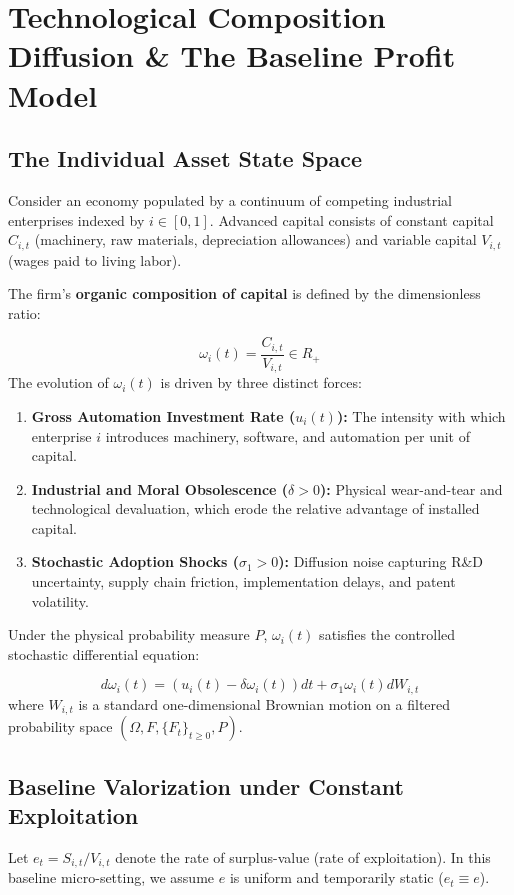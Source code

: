 \documentclass[11pt,letterpaper]{report}
\begin{document}
\section{Technological Composition Diffusion \& The Baseline Profit Model}
\subsection{The Individual Asset State Space}
Consider an economy populated by a continuum of competing industrial enterprises indexed by $i\in [0,1]$. Advanced capital consists of constant capital ${C}_{i,t}$ (machinery, raw materials, depreciation allowances) and variable capital ${V}_{i,t}$ (wages paid to living labor).

The firm's \textbf{organic composition of capital} is defined by the dimensionless ratio:

\[
{\omega }_{i}(t)=\frac{{C}_{i,t}}{{V}_{i,t}}\in {R}_{+}
\]
The evolution of ${\omega }_{i}(t)$ is driven by three distinct forces:

\begin{enumerate}
\item \textbf{Gross Automation Investment Rate (${u}_{i}(t)$):} The intensity with which enterprise $i$ introduces machinery, software, and automation per unit of capital.
\item \textbf{Industrial and Moral Obsolescence ($\delta >0$):} Physical wear-and-tear and technological devaluation, which erode the relative advantage of installed capital.
\item \textbf{Stochastic Adoption Shocks (${\sigma }_{1}>0$):} Diffusion noise capturing R\&D uncertainty, supply chain friction, implementation delays, and patent volatility.
\end{enumerate}
Under the physical probability measure $P$, ${\omega }_{i}(t)$ satisfies the controlled stochastic differential equation:

\[
d{\omega }_{i}(t)=\left({{u}_{i}(t)-\delta {\omega }_{i}(t)}\right)dt+{\sigma }_{1}{\omega }_{i}(t)d{W}_{i,t}
\]
where ${W}_{i,t}$ is a standard one-dimensional Brownian motion on a filtered probability space $(\Omega ,F,\{{F}_{t}{\}}_{t\geq 0},P)$.

\subsection{Baseline Valorization under Constant Exploitation}
Let ${e}_{t}={S}_{i,t}/{V}_{i,t}$ denote the rate of surplus-value (rate of exploitation). In this baseline micro-setting, we assume $e$ is uniform and temporarily static (${e}_{t}\equiv e$).
\end{document}

